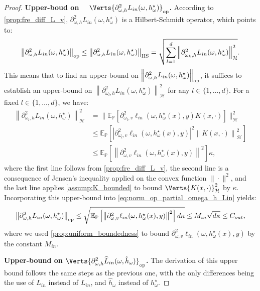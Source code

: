 \begin{proof}
\textbf{Upper-boud on $\quad \Verts{\partial^2_{\omega,h}L_{in}(\omega,h_{\omega}^{\star}) }_{\op}$. }According to \cref{prop:fre_diff_L_v}, $\partial_{\omega, h}^2 L_{in}(\omega, h^\star_\omega)$ is a Hilbert-Schmidt operator, which points to:
\begin{equation}\label{eq:norm_op_partial_omega_h_Lin}
    \left\|\partial_{\omega, h}^2L_{in}(\omega, h^\star_\omega)\right\|_{\operatorname{op}}\leq\left\|\partial_{\omega, h}^2L_{in}(\omega, h^\star_\omega)\right\|_{\operatorname{HS}}=\sqrt{\sum_{l=1}^d\left\|\partial_{\omega_k, h}^2L_{in}(\omega, h^\star_\omega)\right\|_\mathcal{H}^2}.
\end{equation}
This means that to find an upper-bound on $\left\|\partial_{\omega, h}^2L_{in}(\omega, h^\star_\omega)\right\|_{\operatorname{op}}$, it suffices to establish an upper-bound on $\left\|\partial_{\omega_l, h}^2L_{in}(\omega, h^\star_\omega)\right\|_\mathcal{H}^2$ for any $l\in\{1,\ldots,d\}$. For a fixed $l\in\{1,\ldots,d\}$, we have:
\begin{align*}
    \left\|\partial_{\omega_l, h}^2L_{in}(\omega, h^\star_\omega)\right\|_\mathcal{H}^2&=\Big\|\mathbb{E}_\mathbb{P}\left[\partial_{\omega_l,v}^2 \ell_{in}(\omega, h^\star_\omega(x), y)K(x,\cdot)\right]\Big\|_\mathcal{H}^2\\
    &\leq\mathbb{E}_\mathbb{P}\left[\left|\partial_{\omega_l, v}^2 \ell_{in}(\omega, h^\star_\omega(x), y)\right|^2\left\|K(x,\cdot)\right\|_\mathcal{H}^2\right]\\
    &\leq\mathbb{E}_\mathbb{P}\left[\left\|\partial_{\omega, v}^2 \ell_{in}(\omega, h^\star_\omega(x), y)\right\|^2\right]\kappa,
\end{align*}
where the first line follows from \cref{prop:fre_diff_L_v}, the second line is a consequence of Jensen's inequality applied on the convex function $\|\cdot\|^2$, and the last line applies \cref{assump:K_bounded} to bound $\Verts{K(x,\cdot)}_\mathcal{H}^2$ by $\kappa$. Incorporating this upper-bound into \cref{eq:norm_op_partial_omega_h_Lin} yields:
\begin{equation*}
    \left\|\partial_{\omega, h}^2L_{in}(\omega, h^\star_\omega)\right\|_{\operatorname{op}}\leq\sqrt{\mathbb{E}_\mathbb{P}\left[\left\|\partial_{\omega, v}^2 \ell_{in}(\omega, h^\star_\omega(x), y)\right\|^2\right] d\kappa}\leq M_{in}\sqrt{d\kappa}\leq C_{out}, 
\end{equation*}
where we used \cref{prop:uniform_boundedness} to bound $\partial_{\omega, v}^2 \ell_{in}(\omega, h^\star_\omega(x), y)$ by the constant $M_{in}$.

\textbf{Upper-bound on $\Verts{\partial^2_{\omega,h}\widehat{L}_{in}(\omega,\hat{h}_{\omega}) }_{\op}$. }The derivation of this upper bound follows the same steps as the previous one, with the only differences being the use of $\widehat{L}_{in}$ instead of $L_{in}$, and $\hat{h}_\omega$ instead of $h^\star_\omega$.


\end{proof}
